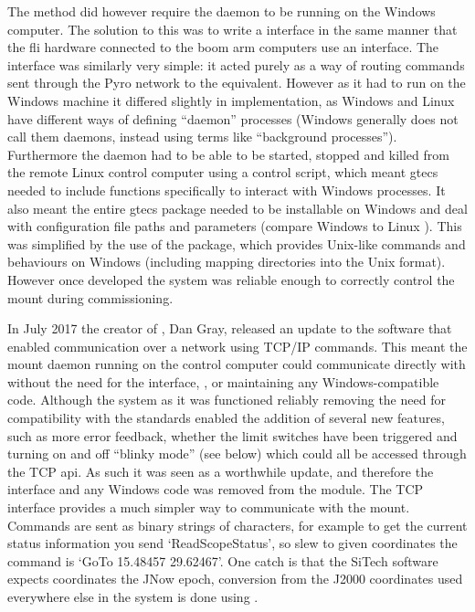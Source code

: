 \begin{colsection}
\begin{colsection}
The  method did however require the  daemon to be running on the Windows computer. The solution to this was to write a  interface in the same manner that the \gls{fli} hardware connected to the boom arm computers use an  interface. The  interface was similarly very simple: it acted purely as a way of routing commands sent through the Pyro network to the  equivalent. However as it had to run on the Windows machine it differed slightly in implementation, as Windows and Linux have different ways of defining ``daemon'' processes (Windows generally does not call them daemons, instead using terms like ``background processes''). Furthermore the daemon had to be able to be started, stopped and killed from the remote Linux control computer using a  control script, which meant \gls{gtecs} needed to include functions specifically to interact with Windows processes. It also meant the entire \gls{gtecs} package needed to be installable on Windows and deal with configuration file paths and parameters (compare Windows  to Linux ). This was simplified by the use of the  package, which provides Unix-like commands and behaviours on Windows (including mapping directories into the Unix format). However once developed the system was reliable enough to correctly control the mount during commissioning.

In July 2017 the creator of , Dan Gray, released an update to the software that enabled communication over a network using TCP/IP commands. This meant the mount daemon running on the control computer could communicate directly with  without the need for the interface, ,  or maintaining any Windows-compatible code. Although the system as it was functioned reliably removing the need for compatibility with the  standards enabled the addition of several new features, such as more error feedback, whether the limit switches have been triggered and turning on and off ``blinky mode'' (see below) which could all be accessed through the TCP \gls{api}. As such it was seen as a worthwhile update, and therefore the  interface and any Windows code was removed from the  module. The TCP interface provides a much simpler way to communicate with the mount. Commands are sent as binary strings of characters, for example to get the current status information you send `ReadScopeStatus', so slew to given coordinates the command is `GoTo 15.48457 29.62467'. One catch is that the SiTech software expects coordinates the JNow epoch, conversion from the J2000 coordinates used everywhere else in the system is done using .


\end{colsection}
\end{colsection}
